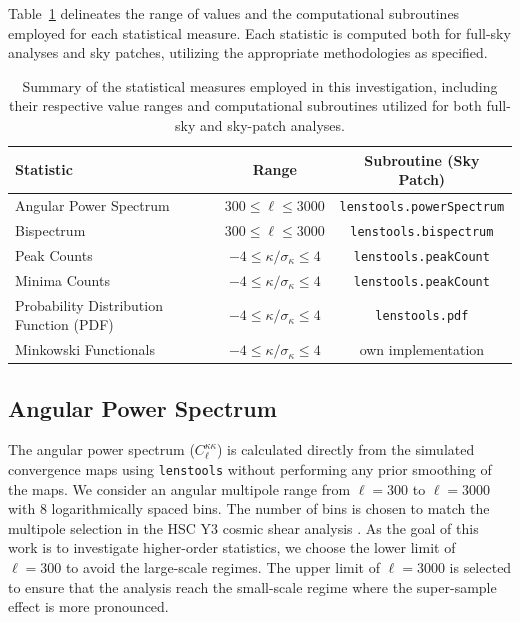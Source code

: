 Table~\ref{tab:statistics} delineates the range of values and the computational subroutines employed for each statistical measure. Each statistic is computed both for full-sky analyses and sky patches, utilizing the appropriate methodologies as specified.
\begin{table}[htbp]
    \centering
    \begin{tabular}{lcc}
    \toprule
    \textbf{Statistic} & \textbf{Range} & \textbf{Subroutine (Sky Patch)} \\
    \midrule
    Angular Power Spectrum & $300 \leq \ell \leq 3000$ & \texttt{lenstools.powerSpectrum} \\
    Bispectrum & $300 \leq \ell \leq 3000$ & \texttt{lenstools.bispectrum} \\
    Peak Counts & $-4 \leq \kappa/\sigma_\kappa \leq 4$ & \texttt{lenstools.peakCount} \\
    Minima Counts & $-4 \leq \kappa/\sigma_\kappa \leq 4$ & \texttt{lenstools.peakCount} \\
    Probability Distribution Function (PDF) & $-4 \leq \kappa/\sigma_\kappa \leq 4$ & \texttt{lenstools.pdf} \\
    Minkowski Functionals & $-4 \leq \kappa/\sigma_\kappa \leq 4$ & own implementation \\
    \bottomrule
    \end{tabular}
    \caption{Summary of the statistical measures employed in this investigation, including their respective value ranges and computational subroutines utilized for both full-sky and sky-patch analyses.}\label{tab:statistics}
\end{table}

\subsection{Angular Power Spectrum}
The angular power spectrum ($C_{\ell}^{\kappa\kappa}$) is calculated directly from the simulated convergence maps using \texttt{lenstools} \citep{2016A&C....17...73P} without performing any prior smoothing of the maps. We consider an angular multipole range from $\ell = 300$ to $\ell = 3000$ with $8$ logarithmically spaced bins. The number of bins is chosen to match the multipole selection in the HSC Y3 cosmic shear analysis \citep{2023PhRvD.108l3519D}. As the goal of this work is to investigate higher-order statistics, we choose the lower limit of $\ell = 300$ to avoid the large-scale regimes. The upper limit of $\ell = 3000$ is selected to ensure that the analysis reach the small-scale regime where the super-sample effect is more pronounced.

